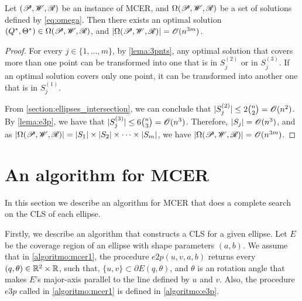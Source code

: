 \begin{theorem}\label{th:mcer}
	Let $(\mathscr{P}, \mathscr{W}, \mathscr{R})$ be an instance of MCER, and $\Omega(\mathscr{P}, \mathscr{W}, \mathscr{R})$ be a set of solutions defined by \autoref{eq:omega}. Then there exists an optimal solution $(Q^*, \Theta^*) \in \Omega(\mathscr{P}, \mathscr{W}, \mathscr{R})$, and $|\Omega(\mathscr{P}, \mathscr{W}, \mathscr{R})|=\mathscr{O}(n^{3m})$.	
\end{theorem}

\begin{proof}
	For every $j \in \{1, \dots, m\}$, by \autoref{lema:3pnts}, any optimal solution that covers more than one point can be transformed into one that is in $S_j^{(2)}$ or in $S_j^{(3)}$.
	If an optimal solution covers only one point, it can be transformed into another one that is in $S_j^{(1)}$.
	
	From \autoref{section:ellipses_intersection}, we can conclude that $|S_j^{(2)}|\le 2\binom{n}{2} = \mathscr{O}(n^2)$.
	By \autoref{lema:e3p}, we have that $|S_j^{(3)}| \le 6\binom{n}{3} = \mathscr{O}(n^3)$.
	Therefore, $|S_j|=\mathscr{O}(n^3)$, and as $|\Omega(\mathscr{P}, \mathscr{W}, \mathscr{R})|= |S_1|\times|S_2|\times\dots\times|S_m|$, we have $|\Omega(\mathscr{P}, \mathscr{W}, \mathscr{R})|=\mathscr{O}(n^{3m})$.
\end{proof}

\section{An algorithm for MCER}

In this section we describe an algorithm for MCER that does a complete search on the CLS of each ellipse.

Firstly, we describe an algorithm that constructs a CLS for a given ellipse.
Let $E$ be the coverage region of an ellipse with shape parameters $(a, b)$. We assume that in \autoref{algoritmo:mcer1}, the procedure $e2p(u, v, a, b)$ returns every $(q, \theta) \in \mathbb{R}^2\times\mathbb{R}$, such that, $\{u, v\}\subset \partial E(q, \theta)$, and $\theta$ is an rotation angle that makes $E$'s major-axis parallel to the line defined by $u$ and $v$. Also, the procedure $e3p$ called in \autoref{algoritmo:mcer1} is defined in \autoref{algoritmo:e3p}.

